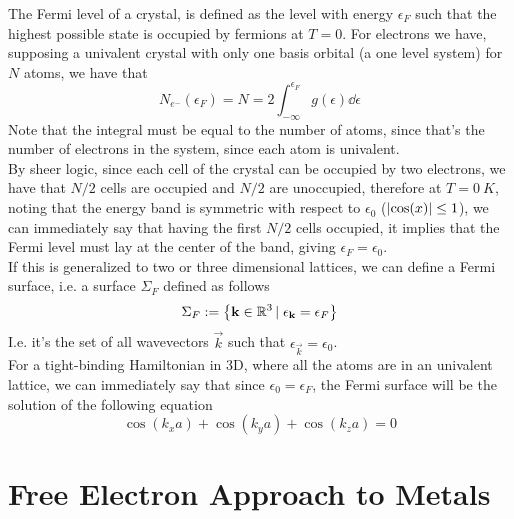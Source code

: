 \documentclass[../qm.tex]{subfiles}
\begin{document}
The Fermi level of a crystal, is defined as the level with energy $\epsilon_F$ such that the highest possible state is occupied by fermions at $T=0$. For electrons we have, supposing a univalent crystal with only one basis orbital (a one level system) for $N$ atoms, we have that
\begin{equation}
	N_{e^-}(\epsilon_F)=N=2\int_{-\infty}^{\epsilon_F}g(\epsilon)\dd\epsilon
	\label{eq:fermilevelcrystal}
\end{equation}
Note that the integral must be equal to the number of atoms, since that's the number of electrons in the system, since each atom is univalent.\\
By sheer logic, since each cell of the crystal can be occupied by two electrons, we have that $N/2$ cells are occupied and $N/2$ are unoccupied, therefore at $T=0\ K$, noting that the energy band is symmetric with respect to $\epsilon_0$ ($\abs{\cos(x)}\le1$), we can immediately say that having the first $N/2$ cells occupied, it implies that the Fermi level must lay at the center of the band, giving $\epsilon_F=\epsilon_0$.\\
If this is generalized to two or three dimensional lattices, we can define a Fermi surface, i.e. a surface $\Sigma_F$ defined as follows
\begin{equation*}
	\Sigma_F:=\left\{\mathbf{k}\in\mathbb{R}^3\left|\right. \epsilon_{\mathbf{k}}=\epsilon_F \right\}
\end{equation*}
I.e. it's the set of all wavevectors $\vec{k}$ such that $\epsilon_\vec{k}=\epsilon_0$.\\
For a tight-binding Hamiltonian in 3D, where all the atoms are in an univalent lattice, we can immediately say that since $\epsilon_0=\epsilon_F$, the Fermi surface will be the solution of the following equation
\begin{equation}
	\cos(k_xa)+\cos(k_ya)+\cos(k_za)=0
	\label{eq:3dlatticefermilevel}
\end{equation}
\section{Free Electron Approach to Metals}
\end{document}
